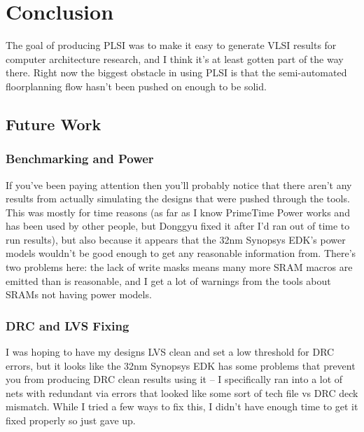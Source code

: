 \documentclass{article}
\begin{document}
\chapter{Conclusion}

The goal of producing PLSI was to make it easy to generate VLSI results for
computer architecture research, and I think it's at least gotten part of the
way there.  Right now the biggest obstacle in using PLSI is that the
semi-automated floorplanning flow hasn't been pushed on enough to be solid.

\section{Future Work}

\subsection{Benchmarking and Power}

If you've been paying attention then you'll probably notice that there aren't
any results from actually simulating the designs that were pushed through the
tools.  This was mostly for time reasons (as far as I know PrimeTime Power
works and has been used by other people, but Donggyu fixed it after I'd ran out
of time to run results), but also because it appears that the 32nm Synopsys
EDK's power models wouldn't be good enough to get any reasonable information
from.  There's two problems here: the lack of write masks means many more SRAM
macros are emitted than is reasonable, and I get a lot of warnings from the
tools about SRAMs not having power models.

\subsection{DRC and LVS Fixing}

I was hoping to have my designs LVS clean and set a low threshold for DRC
errors, but it looks like the 32nm Synopsys EDK has some problems that prevent
you from producing DRC clean results using it -- I specifically ran into a lot
of nets with redundant via errors that looked like some sort of tech file vs
DRC deck mismatch.  While I tried a few ways to fix this, I didn't have enough
time to get it fixed properly so just gave up.
\end{document}
